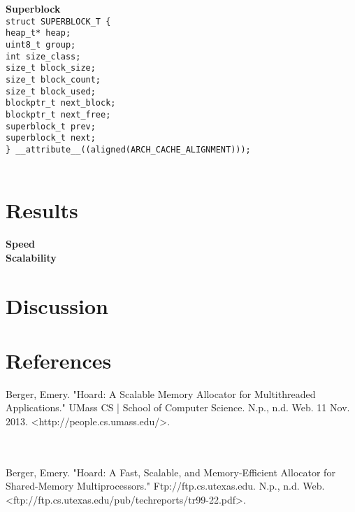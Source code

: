 \documentclass[11pt]{article}
\begin{document}
\textbf{Superblock}
\texttt{
\\
struct SUPERBLOCK\_T \{
\\
    heap\_t* heap;
\\
    uint8\_t group;
\\
    int size\_class;
\\
    size\_t block\_size;
\\
    size\_t block\_count;
\\
    size\_t block\_used;
\\
    blockptr\_t next\_block;
\\
    blockptr\_t next\_free;
\\
    superblock\_t\* prev;
\\
    superblock\_t\* next;
\\
\} \_\_attribute\_\_((aligned(ARCH\_CACHE\_ALIGNMENT)));
}
\\
\\


\section{Results}
\textbf{Speed}
\\
\textbf{Scalability}
\\
\section{Discussion}
 


\section{References}

Berger, Emery. "Hoard: A Scalable Memory Allocator for Multithreaded Applications." UMass CS | School of Computer Science. N.p., n.d. Web. 11 Nov. 2013. <http://people.cs.umass.edu/>.

\\
\\
Berger, Emery. "Hoard: A Fast, Scalable, and Memory-Efficient Allocator for Shared-Memory Multiprocessors." Ftp://ftp.cs.utexas.edu. N.p., n.d. Web. <ftp://ftp.cs.utexas.edu/pub/techreports/tr99-22.pdf>.

\end{document}
